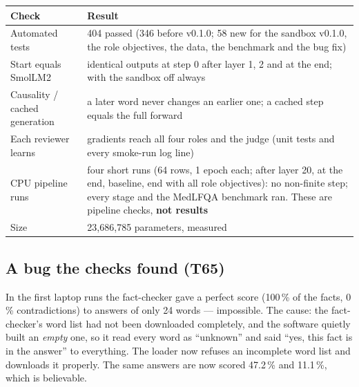 \documentclass[a4paper,12pt,parskip=half,headsepline]{scrartcl}
\begin{document}
\begin{center}
\begin{tabularx}{\linewidth}{@{}p{4.2cm}Y@{}}
\toprule
\textbf{Check} & \textbf{Result}\\
\midrule
Automated tests & 404 passed (346 before v0.1.0; 58 new for the sandbox v0.1.0, the role objectives, the data, the benchmark and the bug fix)\\
Start equals SmolLM2 & identical outputs at step 0 after layer 1, 2 and at the end; with the sandbox off always\\
Causality / cached generation & a later word never changes an earlier one; a cached step equals the full forward\\
Each reviewer learns & gradients reach all four roles and the judge (unit tests and every smoke-run log line)\\
CPU pipeline runs & four short runs (64 rows, 1 epoch each; after layer 20, at the end, baseline, end with all role objectives): no non-finite step; every stage and the MedLFQA benchmark ran. These are pipeline checks, \textbf{not results}\\
Size & 23{,}686{,}785 parameters, measured\\
\bottomrule
\end{tabularx}
\end{center}

\subsection{A bug the checks found (T65)}

\begin{plain}
In the first laptop runs the fact-checker gave a perfect score (100\,\% of the facts,
0\,\% contradictions) to answers of only 24 words --- impossible. The cause: the
fact-checker's word list had not been downloaded completely, and the software
quietly built an \emph{empty} one, so it read every word as ``unknown'' and said
``yes, this fact is in the answer'' to everything. The loader now refuses an
incomplete word list and downloads it properly. The same answers are now scored
47.2\,\% and 11.1\,\%, which is believable.
\end{plain}
\end{document}
